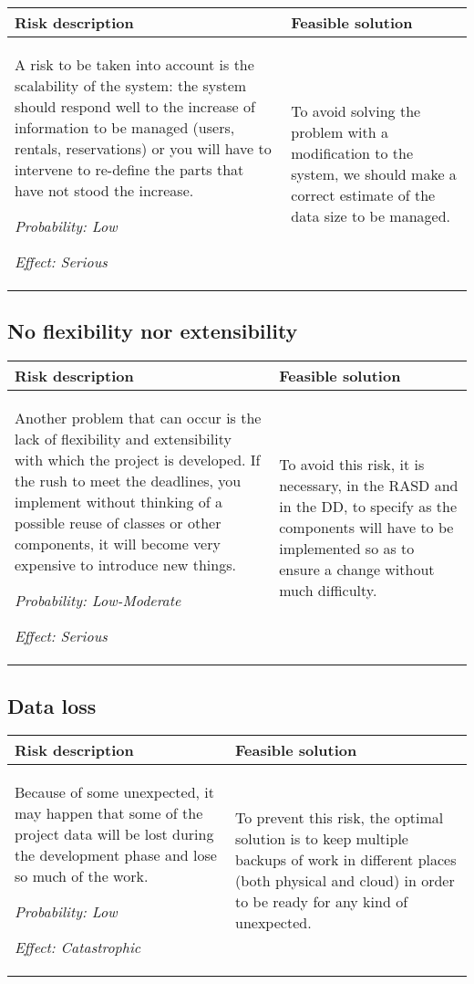 \documentclass{scrreprt}
\begin{document}
\begin{center}
\begin{tabularx}{\columnwidth}{XX}
\toprule \textbf{Risk description} & \textbf{Feasible solution}\\
\midrule
A risk to be taken into account is the scalability of the system: the system should respond well to the increase of  information to be managed (users, rentals, reservations) or you will have to intervene to re-define the parts that have not stood the increase. 

\emph{Probability: Low} 

\emph{Effect: Serious}& To avoid solving the problem with a modification to the system, we should make a correct estimate of the data size to be managed.\\
\bottomrule
\end{tabularx}
\end{center}

\subsection{No flexibility nor extensibility}


\begin{center}
\begin{tabularx}{\columnwidth}{XX}
\toprule \textbf{Risk description} & \textbf{Feasible solution}\\
\midrule
Another problem that can occur is the lack of flexibility and extensibility with which the project is developed. If the rush to meet the deadlines, you implement without thinking of a possible reuse of classes or other components, it will become very expensive to introduce new things. 

\emph{Probability: Low-Moderate } 

\emph{Effect: Serious} & To avoid this risk, it is necessary, in the RASD and in the DD, to specify as the components will have to be implemented so as to ensure a change without much difficulty.\\
\bottomrule
\end{tabularx}
\end{center}

\subsection{Data loss}


\begin{center}
\begin{tabularx}{\columnwidth}{XX}
\toprule \textbf{Risk description} & \textbf{Feasible solution}\\
\midrule
Because of some unexpected, it may happen that some of the project data will be lost during the development phase and lose so much of the work. 

\emph{Probability: Low } 

\emph{Effect: Catastrophic}& To prevent this risk, the optimal solution is to keep multiple backups of work in different places (both physical and cloud) in order to be ready for any kind of unexpected.\\
\bottomrule
\end{tabularx}
\end{center}
\end{document}
